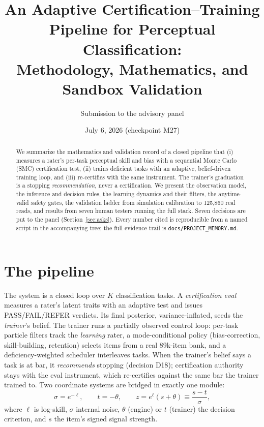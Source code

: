 \documentclass[11pt]{article}
\title{An Adaptive Certification--Training Pipeline for Perceptual Classification:\\
Methodology, Mathematics, and Sandbox Validation}
\author{Submission to the advisory panel}
\date{July 6, 2026 (checkpoint M27)}
\begin{document}
\maketitle

\begin{abstract}
\noindent We summarize the mathematics and validation record of a closed pipeline that
(i) measures a rater's per-task perceptual skill and bias with a sequential Monte
Carlo (SMC) certification test, (ii) trains deficient tasks with an adaptive,
belief-driven training loop, and (iii) re-certifies with the same instrument. The
trainer's graduation is a stopping \emph{recommendation}, never a certification.
We present the observation model, the inference and decision rules, the learning
dynamics and their filters, the anytime-valid safety gates, the validation ladder
from simulation calibration to 125{,}860 real reads, and results from seven human
testers running the full stack. Seven decisions are put to the panel
(Section~\ref{sec:asks}). Every number cited is reproducible from a named script
in the accompanying tree; the full evidence trail is \texttt{docs/PROJECT\_MEMORY.md}.
\end{abstract}

\section{The pipeline}
The system is a closed loop over $K$ classification tasks. A \emph{certification
eval} measures a rater's latent traits with an adaptive test and issues
PASS/FAIL/REFER verdicts. Its final posterior, variance-inflated, seeds the
\emph{trainer}'s belief. The trainer runs a partially observed control loop:
per-task particle filters track the \emph{learning} rater, a mode-conditional
policy (bias-correction, skill-building, retention) selects items from a real
89k-item bank, and a deficiency-weighted scheduler interleaves tasks. When the
trainer's belief says a task is at bar, it \emph{recommends} stopping (decision
D18); certification authority stays with the eval instrument, which re-certifies
against the same bar the trainer trained to. Two coordinate systems are bridged
in exactly one module:
\begin{equation}
\sigma = e^{-\ell}, \qquad t = -\theta, \qquad
z = e^{\ell}(s+\theta) \equiv \frac{s-t}{\sigma},
\end{equation}
where $\ell$ is log-skill, $\sigma$ internal noise, $\theta$ (engine) or $t$
(trainer) the decision criterion, and $s$ the item's signed signal strength.
\end{document}
